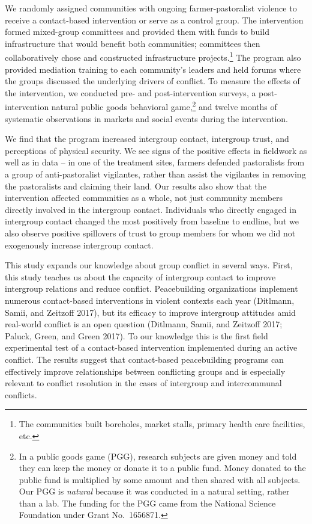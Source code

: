 \documentclass[11pt]{article}
\begin{document}
We randomly assigned communities with ongoing farmer-pastoralist
violence to receive a contact-based intervention or serve as a control
group. The intervention formed mixed-group committees and provided them
with funds to build infrastructure that would benefit both communities;
committees then collaboratively chose and constructed infrastructure
projects.\footnote{The communities built boreholes, market stalls,
  primary health care facilities, etc.} The program also provided
mediation training to each community's leaders and held forums where the
groups discussed the underlying drivers of conflict. To measure the
effects of the intervention, we conducted pre- and post-intervention
surveys, a post-intervention natural public goods behavioral
game,\footnote{In a public goods game (PGG), research subjects are given
  money and told they can keep the money or donate it to a public fund.
  Money donated to the public fund is multiplied by some amount and then
  shared with all subjects. Our PGG is \emph{natural} because it was
  conducted in a natural setting, rather than a lab. The funding for the
  PGG came from the National Science Foundation under Grant No.~1656871.}
and twelve months of systematic observations in markets and social
events during the intervention.

We find that the program increased intergroup contact, intergroup trust,
and perceptions of physical security. We see signs of the positive
effects in fieldwork as well as in data -- in one of the treatment
sites, farmers defended pastoralists from a group of anti-pastoralist
vigilantes, rather than assist the vigilantes in removing the
pastoralists and claiming their land. Our results also show that the
intervention affected communities as a whole, not just community members
directly involved in the intergroup contact. Individuals who directly
engaged in intergroup contact changed the most positively from baseline
to endline, but we also observe positive spillovers of trust to group
members for whom we did not exogenously increase intergroup contact.

This study expands our knowledge about group conflict in several ways.
First, this study teaches us about the capacity of intergroup contact to
improve intergroup relations and reduce conflict. Peacebuilding
organizations implement numerous contact-based interventions in violent
contexts each year (Ditlmann, Samii, and Zeitzoff 2017), but its
efficacy to improve intergroup attitudes amid real-world conflict is an
open question (Ditlmann, Samii, and Zeitzoff 2017; Paluck, Green, and
Green 2017). To our knowledge this is the first field experimental test
of a contact-based intervention implemented during an active conflict.
The results suggest that contact-based peacebuilding programs can
effectively improve relationships between conflicting groups and is
especially relevant to conflict resolution in the cases of intergroup
and intercommunal conflicts.
\end{document}
